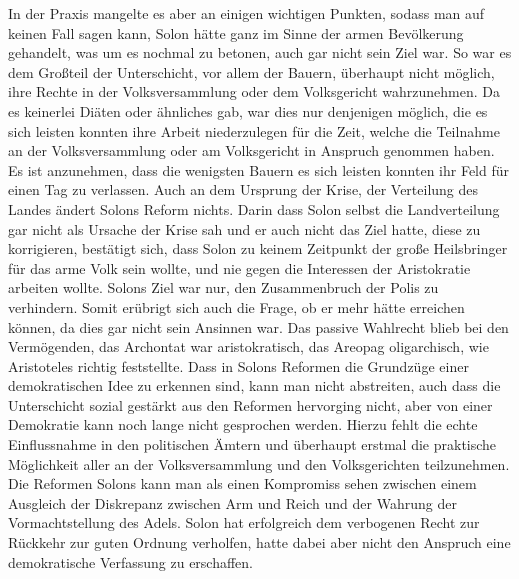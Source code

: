 \documentclass{article}
\begin{document}
In der Praxis mangelte es aber an einigen wichtigen Punkten, sodass man auf keinen Fall sagen kann, Solon hätte ganz im Sinne der armen Bevölkerung gehandelt, was um es nochmal zu betonen, auch gar nicht sein Ziel war. So war es dem Großteil der Unterschicht, vor allem der Bauern, überhaupt nicht möglich, ihre Rechte in der Volksversammlung oder dem Volksgericht wahrzunehmen. Da es keinerlei Diäten oder ähnliches gab, war dies nur denjenigen möglich, die es sich leisten konnten ihre Arbeit niederzulegen für die Zeit, welche die Teilnahme an der Volksversammlung oder am Volksgericht in Anspruch genommen haben. Es ist anzunehmen, dass die wenigsten Bauern es sich leisten konnten ihr Feld für einen Tag zu verlassen. Auch an dem Ursprung der Krise, der Verteilung des Landes ändert Solons Reform nichts. Darin dass Solon selbst die Landverteilung gar nicht als Ursache der Krise sah und er auch nicht das Ziel hatte, diese zu korrigieren, bestätigt sich, dass Solon zu keinem Zeitpunkt der große Heilsbringer für das arme Volk sein wollte, und nie gegen die Interessen der Aristokratie arbeiten wollte. Solons Ziel war nur, den Zusammenbruch der Polis zu verhindern. Somit erübrigt sich auch die Frage, ob er mehr hätte erreichen können, da dies gar nicht sein Ansinnen war. Das passive Wahlrecht blieb bei den Vermögenden, das Archontat war aristokratisch, das Areopag oligarchisch, wie Aristoteles richtig feststellte. Dass in Solons Reformen die Grundzüge einer demokratischen Idee zu erkennen sind, kann man nicht abstreiten, auch dass die Unterschicht sozial gestärkt aus den Reformen hervorging nicht, aber von einer Demokratie kann noch lange nicht gesprochen werden. Hierzu fehlt die echte Einflussnahme in den politischen Ämtern und überhaupt erstmal die praktische Möglichkeit aller an der Volksversammlung und den Volksgerichten teilzunehmen.  \\
Die Reformen Solons kann man als einen Kompromiss sehen zwischen einem Ausgleich der Diskrepanz zwischen Arm und Reich und der Wahrung der Vormachtstellung des Adels. Solon hat erfolgreich dem verbogenen Recht zur Rückkehr zur guten Ordnung verholfen, hatte dabei aber nicht den Anspruch eine demokratische Verfassung zu erschaffen. 
  
\end{document}
